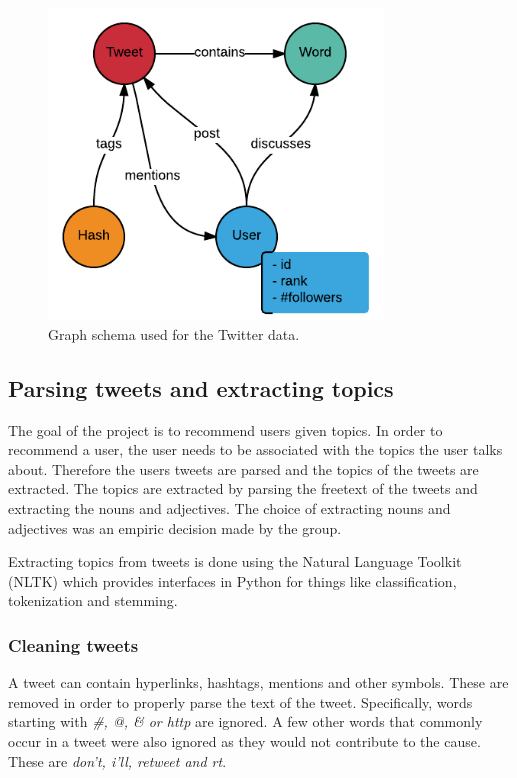 \begin{figure}[t]
\centering
\includegraphics[width=3.5in]{images/Schema.png}
\caption{Graph schema used for the Twitter data.}
\label{fig:schema}
\end{figure}


\subsection{Parsing tweets and extracting topics}

The goal of the project is to recommend users given topics. In order to
recommend a user, the user needs to be associated with the topics the user talks
about. Therefore the users tweets are parsed and the topics of the tweets are
extracted.  The topics are extracted by parsing the freetext of the tweets and
extracting the nouns and adjectives.  The choice of extracting nouns and
adjectives was an empiric decision made by the group.

Extracting topics from tweets is done using the Natural Language Toolkit (NLTK)
\cite{bird2006nltk} which provides interfaces in Python for things like
classification, tokenization and stemming.

\subsubsection{Cleaning tweets}

A tweet can contain hyperlinks, hashtags, mentions and other symbols. These are
removed in order to properly parse the text of the tweet. Specifically, words
starting with \textit{\#, @, \& or http} are ignored. A few other words that
commonly occur in a tweet were also ignored as they would not contribute to the
cause. These are \textit{don't, i'll, retweet and rt}.

